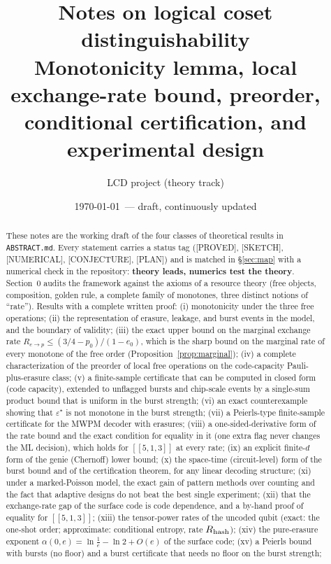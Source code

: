 \documentclass[a4paper,11pt]{article}
\title{Notes on logical coset distinguishability\\\large Monotonicity lemma, local exchange-rate bound, preorder, conditional certification, and experimental design}
\author{LCD project (theory track)}
\date{\today\ --- draft, continuously updated}
\theoremstyle{plain}
\theoremstyle{definition}
\theoremstyle{remark}
\newcommand{\st}[1]{{\small\textsc{[\textcolor{red!60!black}{#1}]}}}
\newcommand{\err}{\varepsilon^{\star}}           %
\begin{document}
\maketitle

\begin{abstract}\noindent
These notes are the working draft of the four classes of theoretical results in \texttt{ABSTRACT.md}. Every statement carries a status tag
(\st{PROVED}, \st{SKETCH}, \st{NUMERICAL}, \st{CONJECTURE}, \st{PLAN}) and is matched in \S\ref{sec:map}
with a numerical check in the repository: \textbf{theory leads, numerics test the theory}.
Section~0 audits the framework against the axioms of a resource theory (free objects, composition, golden rule, a complete family of monotones, three distinct notions of ``rate'').
Results with a complete written proof: (i) monotonicity under the three free operations; (ii) the representation of erasure, leakage, and burst events in the model, and the boundary of validity;
(iii) the exact upper bound on the marginal exchange rate
$R_{e\to p}\le (3/4-p_0)/(1-e_0)$, which is the sharp bound on the marginal rate of every monotone of the free order (Proposition~\ref{prop:marginal}); (iv) a complete characterization of the preorder of local free operations on the code-capacity Pauli-plus-erasure class;
(v) a finite-sample certificate that can be computed in closed form (code capacity), extended to unflagged bursts and chip-scale events by a single-sum product bound that is uniform in the burst strength;
(vi) an exact counterexample showing that $\err$ is not monotone in the burst strength;
(vii) a Peierls-type finite-sample certificate for the MWPM decoder with erasures;
(viii) a one-sided-derivative form of the rate bound and the exact condition for equality in it (one extra flag never changes the ML decision), which holds for $[[5,1,3]]$ at every rate;
(ix) an explicit finite-$d$ form of the genie (Chernoff) lower bound;
(x) the space-time (circuit-level) form of the burst bound and of the certification theorem, for any linear decoding structure;
(xi) under a marked-Poisson model, the exact gain of pattern methods over counting and the fact that adaptive designs do not beat the best single experiment;
(xii) that the exchange-rate gap of the surface code is code dependence, and a by-hand proof of equality for $[[5,1,3]]$;
(xiii) the tensor-power rates of the uncoded qubit (exact: the one-shot order; approximate: conditional entropy, rate $R_{\rm hash}$);
(xiv) the pure-erasure exponent $\alpha(0,e)=\ln\frac1e-\ln2+O(e)$ of the surface code;
(xv) a Peierls bound with bursts (no floor) and a burst certificate that needs no floor on the burst strength;

\end{abstract}
\end{document}
